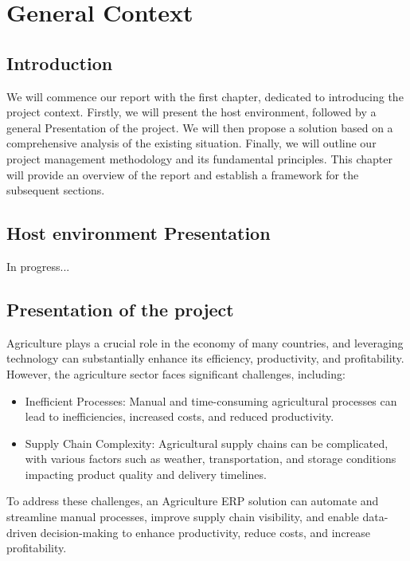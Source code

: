 \chapter{General Context }

\newpage

\lhead{\leftmark}

\cfoot{\thepage}

\parindent=0.5in


\section{Introduction}
We will commence our report with the first chapter, dedicated to introducing the project context. Firstly, we will present the host environment, followed by a general Presentation of the project. We will then propose a solution based on a comprehensive analysis of the existing situation. Finally, we will outline our project management methodology and its fundamental principles. This chapter will provide an overview of the report and establish a framework for the subsequent sections.

\section{Host environment Presentation}
In progress...
\section{Presentation of the project}
Agriculture plays a crucial role in the economy of many countries, and leveraging technology can substantially enhance its efficiency, productivity, and profitability. However, the agriculture sector faces significant challenges, including:
\begin{itemize}
    \item Inefficient Processes: Manual and time-consuming agricultural processes can lead to inefficiencies, increased costs, and reduced productivity.

    \item Supply Chain Complexity: Agricultural supply chains can be complicated, with various factors such as weather, transportation, and storage conditions impacting product quality and delivery timelines.
\end{itemize}

To address these challenges, an Agriculture ERP solution can automate and streamline manual processes, improve supply chain visibility, and enable data-driven decision-making to enhance productivity, reduce costs, and increase profitability. 
